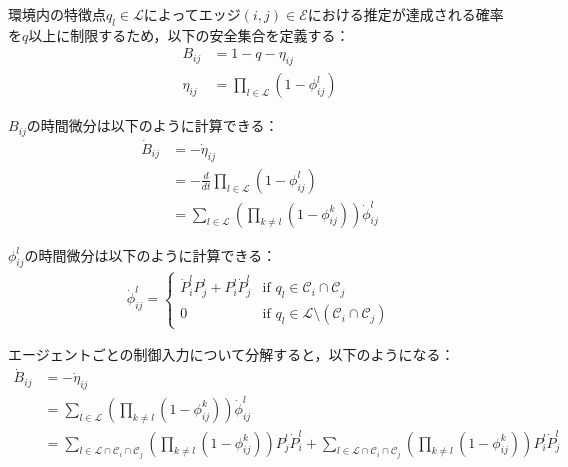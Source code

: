 環境内の特徴点$q_l \in \mathcal{L}$によってエッジ$(i,j) \in \mathcal{E}$における推定が達成される確率を$q$以上に制限するため，以下の安全集合を定義する：
\begin{equation}
\begin{aligned}
B_{ij} &= 1 - q - \eta_{ij} \\
\eta_{ij} &= \prod_{l \in \mathcal{L}} (1 - \phi_{ij}^l)
\label{eq:common_safe_set}
\end{aligned}
\end{equation}

$B_{ij}$の時間微分は以下のように計算できる：
\begin{equation}
\begin{aligned}
\dot{B}_{ij} &= -\dot{\eta}_{ij} \\
&= -\frac{d}{dt}\prod_{l \in \mathcal{L}}(1 - \phi_{ij}^l) \\
&= \sum_{l \in \mathcal{L}}\left(\prod_{k \neq l}(1 - \phi_{ij}^k)\right)\dot{\phi}_{ij}^l
\label{eq:common_cbf_derivative}
\end{aligned}
\end{equation}

$\phi_{ij}^l$の時間微分は以下のように計算できる：
\begin{equation}
\begin{aligned}
\dot{\phi}_{ij}^l = 
\begin{cases}
\dot{P}_i^l P_j^l + P_i^l \dot{P}_j^l & \text{if } q_l \in \mathcal{C}_i \cap \mathcal{C}_j \\
0 & \text{if } q_l \in \mathcal{L} \setminus (\mathcal{C}_i \cap \mathcal{C}_j)
\end{cases}
\label{eq:common_probability_derivative}
\end{aligned}
\end{equation}

エージェントごとの制御入力について分解すると，以下のようになる：
\begin{equation}
\begin{aligned}
\dot{B}_{ij} &= -\dot{\eta}_{ij} \\
&= \sum_{l \in \mathcal{L}}\left(\prod_{k \neq l}(1 - \phi_{ij}^k)\right)\dot{\phi}_{ij}^l \\
&= \sum_{l \in \mathcal{L} \cap \mathcal{C}_i \cap \mathcal{C}_j}\left(\prod_{k \neq l}(1 - \phi_{ij}^k)\right)P_j^l\dot{P}_i^l + \sum_{l \in \mathcal{L} \cap \mathcal{C}_i \cap \mathcal{C}_j}\left(\prod_{k \neq l}(1 - \phi_{ij}^k)\right)P_i^l\dot{P}_j^l
\label{eq:common_cbf_derivative_decomposed}
\end{aligned}
\end{equation}

